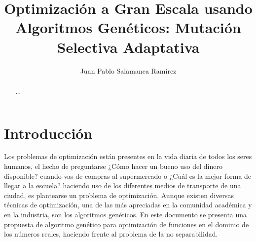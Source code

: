 \documentclass{llncs}
\begin{document}
\title{Optimización a Gran Escala usando Algoritmos Genéticos: Mutación Selectiva Adaptativa}
%
%
\author{Juan Pablo Salamanca Ramírez}
%
%
\tocauthor{}
%

\maketitle

\begin{abstract}
...
\end{abstract}
%



\section{Introducción}
Los problemas de optimización están presentes en la vida diaria de todos los seres humanos, el hecho de preguntarse ¿Cómo hacer un bueno uso del dinero disponible? cuando vas de compras al supermercado o ¿Cuál es la mejor forma de llegar a la escuela? haciendo uso de los diferentes medios de transporte de una ciudad, es plantearse un problema de optimización. Aunque existen diversas técnicas de optimización, una de las más apreciadas en la comunidad académica y en la industria, son los algoritmos genéticos. En este documento se presenta una propuesta de algoritmo genético para optimización de funciones en el dominio de los números reales, haciendo frente al problema de la no separabilidad.

\end{document}
